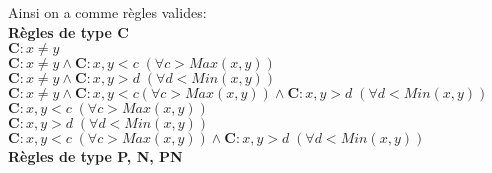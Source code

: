 \documentclass[a4paper]{article}
\begin{document}
\begin{landscape}


Ainsi on a comme règles valides:\\

\noindent \textbf{Règles de type C}\\
$\mathbf{C}:x\neq y$\\
$\mathbf{C}:x\neq y \wedge \mathbf{C}:x,y<c\; (\forall c>Max(x,y))$\\
$\mathbf{C}:x\neq y \wedge \mathbf{C}:x,y>d\; (\forall d<Min(x,y))$\\
$\mathbf{C}:x\neq y \wedge \mathbf{C}:x,y<c (\forall c>Max(x,y))\wedge \mathbf{C}:x,y>d\; (\forall d<Min(x,y))$\\
$\mathbf{C}:x,y<c\; (\forall c>Max(x,y))$\\
$\mathbf{C}:x,y>d\; (\forall d<Min(x,y))$\\
$\mathbf{C}:x,y<c\; (\forall c>Max(x,y))\wedge \mathbf{C}:x,y>d\; (\forall d<Min(x,y))$\\


\noindent \textbf{Règles de type P, N, PN}\\


\end{landscape}
\end{document}
